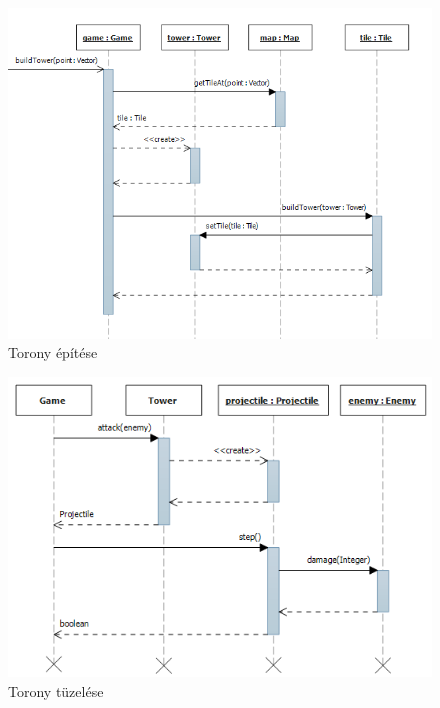\begin{figure}[H]
\begin{center}
\includegraphics[width=15cm]{images/building_tower.png}
\caption{Torony építése}
\label{fig:building_tower}
\end{center}
\end{figure}

\begin{figure}[H]
\begin{center}
\includegraphics[width=15cm]{images/tower_firing.png}
\caption{Torony tüzelése}
\label{fig:tower_firing}
\end{center}
\end{figure}

